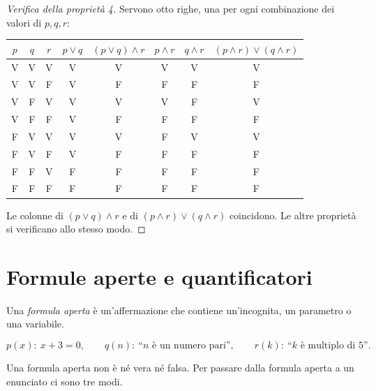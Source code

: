 \documentclass[11pt,a4paper]{article}
\newcommand{\V}{\textsf{V}}
\newcommand{\F}{\textsf{F}}
\begin{document}
\begin{proof}[Verifica della proprietà 4]
Servono otto righe, una per ogni combinazione dei valori di $p, q, r$:
\begin{center}
\begin{tabular}{ccc|c|c|c|c|c}
$p$ & $q$ & $r$ & $p \lor q$ & $(p \lor q) \land r$ & $p \land r$ &
$q \land r$ & $(p \land r) \lor (q \land r)$ \\ \hline
\V & \V & \V & \V & \V & \V & \V & \V \\
\V & \V & \F & \V & \F & \F & \F & \F \\
\V & \F & \V & \V & \V & \V & \F & \V \\
\V & \F & \F & \V & \F & \F & \F & \F \\
\F & \V & \V & \V & \V & \F & \V & \V \\
\F & \V & \F & \V & \F & \F & \F & \F \\
\F & \F & \V & \F & \F & \F & \F & \F \\
\F & \F & \F & \F & \F & \F & \F & \F
\end{tabular}
\end{center}
Le colonne di $(p \lor q) \land r$ e di $(p \land r) \lor (q \land r)$
coincidono. Le altre proprietà si verificano allo stesso modo.
\end{proof}

\section{Formule aperte e quantificatori}

\begin{definizione}
Una \emph{formula aperta} è un'affermazione che contiene un'incognita, un
parametro o una variabile.
\end{definizione}

\begin{esempio}
\[
p(x):\ x + 3 = 0, \qquad
q(n):\ \text{``$n$ è un numero pari''}, \qquad
r(k):\ \text{``$k$ è multiplo di $5$''}.
\]
\end{esempio}

Una formula aperta non è né vera né falsa. Per passare dalla formula aperta
a un enunciato ci sono tre modi.
\end{document}
